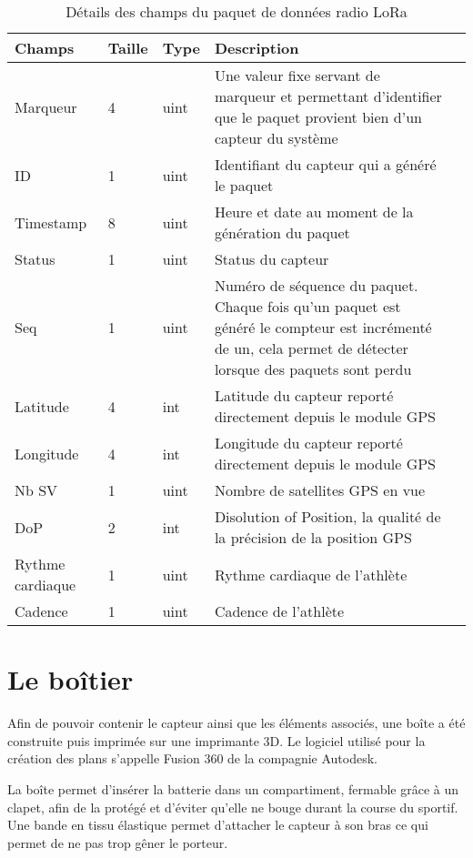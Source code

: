 \begin{table}[htb]
\caption{Détails des champs du paquet de données radio LoRa}
\label{tab:sensor_packet_format}
\centering
\begin{tabular}{ l l l p{9cm} l }
\toprule
Champs & Taille & Type & Description \\
\midrule
Marqueur & 4 & uint & Une valeur fixe servant de marqueur et permettant d'identifier que le paquet provient bien d'un capteur du système \\
ID & 1 & uint & Identifiant du capteur qui a généré le paquet \\
Timestamp & 8 & uint & Heure et date au moment de la génération du paquet \\
Status & 1 & uint & Status du capteur \\
Seq & 1 & uint & Numéro de séquence du paquet. Chaque fois qu'un paquet est généré le compteur est incrémenté de un, cela permet de détecter lorsque des paquets sont perdu \\
Latitude & 4 & int & Latitude du capteur reporté directement depuis le module GPS \\
Longitude & 4 & int & Longitude du capteur reporté directement depuis le module GPS \\
Nb SV & 1 & uint & Nombre de satellites GPS en vue \\
DoP & 2 & int & Disolution of Position, la qualité de la précision de la position GPS \\
Rythme cardiaque & 1 & uint & Rythme cardiaque de l'athlète \\
Cadence & 1 & uint & Cadence de l'athlète \\
\bottomrule 
\end{tabular}
\end{table}

\section{Le boîtier}

Afin de pouvoir contenir le capteur ainsi que les éléments associés, une boîte a été construite puis imprimée sur une imprimante 3D. Le logiciel utilisé pour la création des plans s'appelle Fusion 360 de la compagnie Autodesk.

La boîte permet d'insérer la batterie dans un compartiment, fermable grâce à un clapet, afin de la protégé et d'éviter qu'elle ne bouge durant la course du sportif. Une bande en tissu élastique permet d'attacher le capteur à son bras ce qui permet de ne pas trop gêner le porteur.

